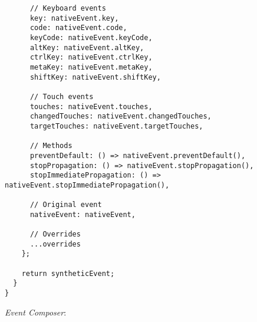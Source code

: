 \documentclass[11pt]{article}
\begin{document}
\begin{verbatim}
      // Keyboard events
      key: nativeEvent.key,
      code: nativeEvent.code,
      keyCode: nativeEvent.keyCode,
      altKey: nativeEvent.altKey,
      ctrlKey: nativeEvent.ctrlKey,
      metaKey: nativeEvent.metaKey,
      shiftKey: nativeEvent.shiftKey,
      
      // Touch events
      touches: nativeEvent.touches,
      changedTouches: nativeEvent.changedTouches,
      targetTouches: nativeEvent.targetTouches,
      
      // Methods
      preventDefault: () => nativeEvent.preventDefault(),
      stopPropagation: () => nativeEvent.stopPropagation(),
      stopImmediatePropagation: () => nativeEvent.stopImmediatePropagation(),
      
      // Original event
      nativeEvent: nativeEvent,
      
      // Overrides
      ...overrides
    };
    
    return syntheticEvent;
  }
}
\end{verbatim}

\emph{Event Composer}:
\end{document}
